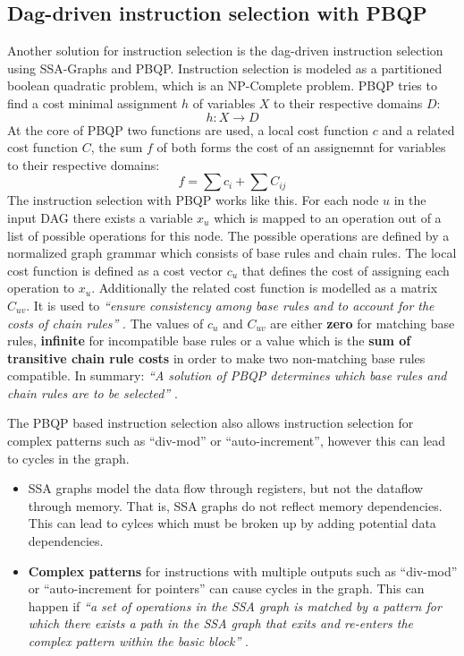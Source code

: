 \documentclass[a4paper,10pt]{article}
\begin{document}
\subsection{Dag-driven instruction selection with PBQP}
Another solution for instruction selection is the dag-driven instruction selection using SSA-Graphs and PBQP. Instruction
selection is modeled as a partitioned boolean quadratic problem, which is
an NP-Complete problem. PBQP tries to find a cost minimal assignment $h$ of variables $X$ to their respective domains $D$:
\[ h: X \rightarrow D\]
At the core of PBQP two functions are used, a local cost function $c$ and a related cost function $C$, the sum $f$ of both forms
the cost of an assignemnt for variables to their respective domains:
\[ f = \sum c_i + \sum{C_{ij}} \]
The instruction selection with PBQP works like this. For each node $u$ in the input DAG there exists a variable $x_u$ which is
mapped to an operation out of a list of possible operations for this node. The possible operations are defined by a normalized
graph grammar which consists of base rules and chain rules. The local cost function is defined as a
cost vector $c_u$ that defines the cost of assigning each operation to $x_u$. Additionally the related cost function is modelled as
a matrix $C_{uv}$. It is used to \textit{``ensure consistency among base rules and to account for the costs of chain rules''}
\cite{pbqp-instruction-selection}. The values of $c_u$ and $C_{uv}$ are either \textbf{zero} for matching base rules,
\textbf{infinite} for incompatible
base rules or a value which is the \textbf{sum of transitive chain rule costs} in order to make two non-matching base rules
compatible. In summary: \textit{``A solution of PBQP determines which base rules and chain rules are to be selected''}
\cite{pbqp-instruction-selection}.

The PBQP based instruction selection also allows instruction selection for complex patterns such as ``div-mod'' or ``auto-increment'',
however this can lead to cycles in the graph.
\begin{itemize}
    \item SSA graphs model the data flow through registers, but not the dataflow through memory. That is, SSA graphs do not reflect
    memory dependencies. This can lead to cylces which must be broken up by adding potential data dependencies.
    \item \textbf{Complex patterns} for instructions with multiple outputs such as ``div-mod'' or ``auto-increment for pointers'' can
          cause cycles in the graph. This can happen if \textit{``a set of operations in the SSA graph is matched by a pattern for which
          there exists a path in the SSA graph that exits and re-enters the complex pattern within the basic block''}
          \cite{pbqp-instruction-selection}.
\end{itemize}
\end{document}
